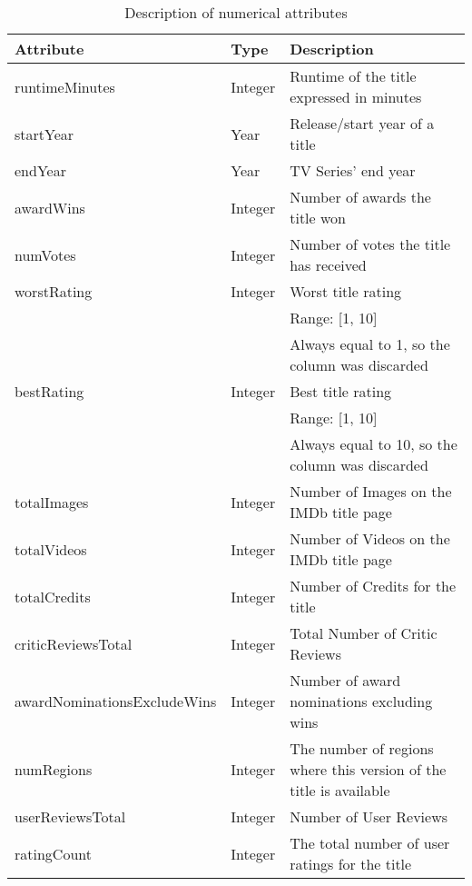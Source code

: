 \begin{table}[h!]
    \centering
    \begin{tabularx}{\textwidth}{|l|l|X|} %
        \hline
        \textbf{Attribute} & \textbf{Type} & \textbf{Description} \\ 
        \hline
        runtimeMinutes & Integer & Runtime of the title expressed in minutes \\ 
        \hline
        startYear & Year & Release/start year of a title \\ 
        \hline
        endYear & Year & TV Series' end year \\
        \hline
        awardWins & Integer & Number of awards the title won \\ 
        \hline
        numVotes & Integer & Number of votes the title has received \\ 
        \hline
        worstRating & Integer & Worst title rating \\
        & & Range: [1, 10] \\
        & & Always equal to 1, so the column was discarded \\
        \hline
        bestRating & Integer & Best title rating \\ 
        & & Range: [1, 10] \\
        & & Always equal to 10, so the column was discarded \\
        \hline
        totalImages & Integer & Number of Images on the IMDb title page \\ 
        \hline
        totalVideos & Integer & Number of Videos on the IMDb title page \\ 
        \hline
        totalCredits & Integer & Number of Credits for the title \\ 
        \hline
        criticReviewsTotal & Integer & Total Number of Critic Reviews \\ 
        \hline
        awardNominationsExcludeWins & Integer & Number of award nominations excluding wins \\ 
        \hline
        numRegions & Integer & The number of regions where this version of the title is available \\ 
        \hline
        userReviewsTotal & Integer & Number of User Reviews \\ 
        \hline
        ratingCount & Integer & The total number of user ratings for the title \\
        \hline
    \end{tabularx}
    \caption{Description of numerical attributes}
    \label{tab:numerical_attributes}
\end{table}


